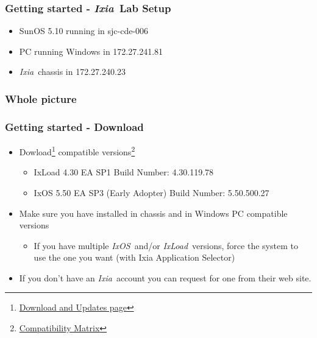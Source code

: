 \documentclass{beamer}
\newcommand{\ixload}{\emph{IxLoad}}
\newcommand{\ixos}{\emph{IxOS}}
\newcommand{\ixia}{\emph{Ixia}}
\begin{document}
\begin{frame}[fragile] \frametitle{Getting started - \ixia~Lab Setup}
\begin{center}
\end{center}
\begin{itemize}
	\item SunOS 5.10 running in sjc-cde-006
	\item PC running Windows in 172.27.241.81
	\item \ixia~chassis in 172.27.240.23
\end{itemize}
\end{frame}

\begin{frame} \frametitle{Whole picture}
	\begin{center}
	\end{center}
\end{frame}

\begin{frame}[fragile] \frametitle{Getting started - Download}
\begin{itemize}
	\item Dowload\footnote{\href{http://www.ixiacom.com/support/downloads\_and\_updates/index.php}{Download and Updates page}} compatible versions\footnote{\href{http://www.ixiacom.com/support/product\_compatibility\_matrix/index.php}{Compatibility Matrix}}
	\begin{itemize}
		\item IxLoad 4.30 EA SP1 Build Number: 4.30.119.78
		\item IxOS 5.50 EA SP3 (Early Adopter) Build Number: 5.50.500.27
	\end{itemize}
	\item Make sure you have installed in chassis and in Windows PC compatible versions
	\begin{itemize}
		\item If you have multiple \ixos~and/or \ixload~versions, force the system to use the one you want (with Ixia Application Selector)
	\end{itemize}
	\item If you don't have an \ixia~account you can request for one from their web site.
\end{itemize}
\end{frame}
\end{document}
